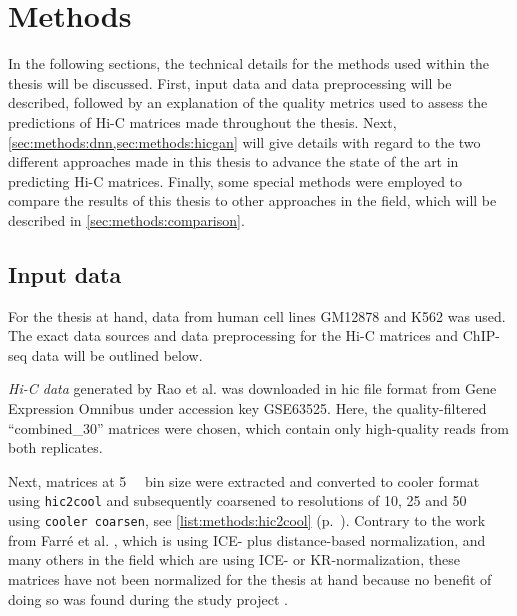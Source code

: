 %
\section{Methods}
In the following sections, the technical details for the methods used within the thesis will be discussed.
First, input data and data preprocessing will be described, followed by an explanation of the quality metrics used to assess the predictions
of Hi-C matrices made throughout the thesis.
Next, \cref{sec:methods:dnn,sec:methods:hicgan} will give details with regard to the two 
different approaches made in this thesis to advance the state of the art in predicting Hi-C matrices.
Finally, some special methods were employed to compare the results of this thesis to 
other approaches in the field, which will be described in \cref{sec:methods:comparison}.

\subsection{Input data} \label{sec:methods:input_data}
For the thesis at hand, data from human cell lines GM12878 and K562 was used.
The exact data sources and data preprocessing for the Hi-C matrices and ChIP-seq data 
will be outlined below.

\emph{Hi-C data} generated by Rao et al. \cite{Rao2014} was downloaded 
in hic file format from Gene Expression Omnibus under accession key GSE63525.
Here, the quality-filtered ``combined\_30'' matrices were chosen, which contain only high-quality reads from 
both replicates.

Next, matrices at \SI{5}{\kilo\bp} bin size were extracted and converted to cooler format using \texttt{hic2cool}
and subsequently coarsened to resolutions of 10, 25 and \SI{50}{\kilo\bp} using \texttt{cooler coarsen},
see \cref{list:methods:hic2cool} (p.~\pageref{list:methods:hic2cool}).
Contrary to the work from Farr\'e et al. \cite{Farre2018a}, which is using ICE- plus distance-based normalization,
and many others in the field which are using ICE- or KR-normalization, 
these matrices have not been normalized for the thesis at hand
because no benefit of doing so was found during the study project \cite{Krauth2020}.

